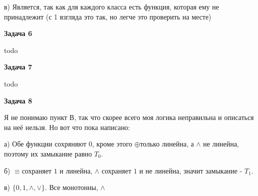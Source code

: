 в) Является, так как для каждого класса есть функция, которая ему не принадлежит (с 1 взгляда это так, но легче это проверить на месте)

\begin{center}
\textbf{Задача 6}
\end{center}
todo
\begin{center}
\textbf{Задача 7}
\end{center}
todo
\begin{center}
\textbf{Задача 8}
\end{center}
Я не понимаю пункт В, так что скорее всего моя логика неправильна и описаться на неё нельзя. Но вот что пока написано:

а) Обе функции сохряняют 0, кроме этого $\displaystyle \oplus $только линейна, а $\displaystyle \land $ не линейна, поэтому их замыкание равно $\displaystyle T_{0}$.

б) $\displaystyle \equiv $сохраняет $\displaystyle 1$ и линейна, $\displaystyle \land $ сохраняет $\displaystyle 1$ и не линейна, значит замыкание - $\displaystyle T_{1}$.

в) $\displaystyle \{0,1,\land ,\lor \}$. Все монотонны, $\displaystyle \land $



